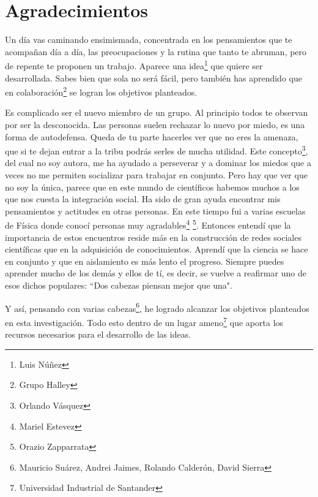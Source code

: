 \documentclass[12pt,oneside,openany,letter]{book}
\begin{document}
\chapter*{Agradecimientos}

Un d\'ia vas caminando ensimismada, concentrada en los pensamientos que te acompa\~nan d\'ia a d\'ia, las preocupaciones y la rutina que tanto te abruman, pero de repente te proponen un trabajo. Aparece una idea\footnote{Luis N\'u\~nez} que quiere ser desarrollada. Sabes bien que sola no ser\'a f\'acil, pero tambi\'en has aprendido que en colaboraci\'on\footnote{Grupo Halley} se logran los objetivos planteados. 

Es complicado ser el nuevo miembro de un grupo. Al principio todos te observan por ser la desconocida. Las personas suelen rechazar lo nuevo por miedo, es una forma de autodefensa. Queda de tu parte hacerles ver que no eres la amenaza, que si te dejan entrar a la tribu podr\'as serles de mucha utilidad. Este concepto\footnote{Orlando V\'asquez}, del cual no soy autora, me ha ayudado a perseverar y a dominar los miedos que a veces no me permiten socializar para trabajar en conjunto. Pero hay que ver que no soy la \'unica, parece que en este mundo de cient\'ificos habemos muchos a los que nos cuesta la integraci\'on social. Ha sido de gran ayuda encontrar mis pensamientos y actitudes en otras personas. En este tiempo fui a varias escuelas de Física donde conoc\'i personas muy agradables\footnote{Mariel Estevez} \footnote{Orazio Zapparrata}. Entonces entendí que la importancia de estos encuentros reside más en la construcción de redes sociales científicas que en la adquisición de conocimientos. Aprend\'i que la ciencia se hace en conjunto y que en aislamiento es m\'as lento el progreso. Siempre puedes aprender mucho de los dem\'as y ellos de t\'i, es decir, se vuelve a reafirmar uno de esos dichos populares: ``Dos cabezas piensan mejor que una".

Y as\'i, pensando con varias cabezas\footnote{Mauricio Su\'arez, Andrei Jaimes, Rolando Calder\'on, David Sierra}, he logrado alcanzar los objetivos planteados en esta investigaci\'on. Todo esto dentro de un lugar ameno\footnote{Universidad Industrial de Santander} que aporta los recursos necesarios para el desarrollo de las ideas.
\end{document}
